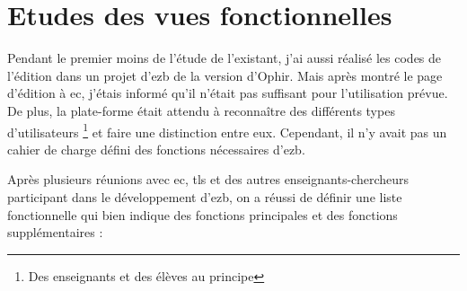 \section{Etudes des vues fonctionnelles}

Pendant le premier moins de l’étude de l’existant, j’ai aussi réalisé les codes de l’édition dans un projet d’ezb de la version d’Ophir. Mais après montré le page d’édition à ec, j’étais informé qu’il n’était pas suffisant pour l’utilisation prévue. De plus, la plate-forme était attendu à reconnaître des différents types d’utilisateurs \footnote{Des enseignants et des élèves au principe} et  faire une distinction entre eux. Cependant, il n’y avait pas un cahier de charge défini des fonctions nécessaires d’ezb. 

Après plusieurs réunions avec ec, tls et des autres enseignants-chercheurs participant dans le développement d’ezb, on a réussi de définir une liste fonctionnelle qui bien indique des fonctions principales et des fonctions supplémentaires :

